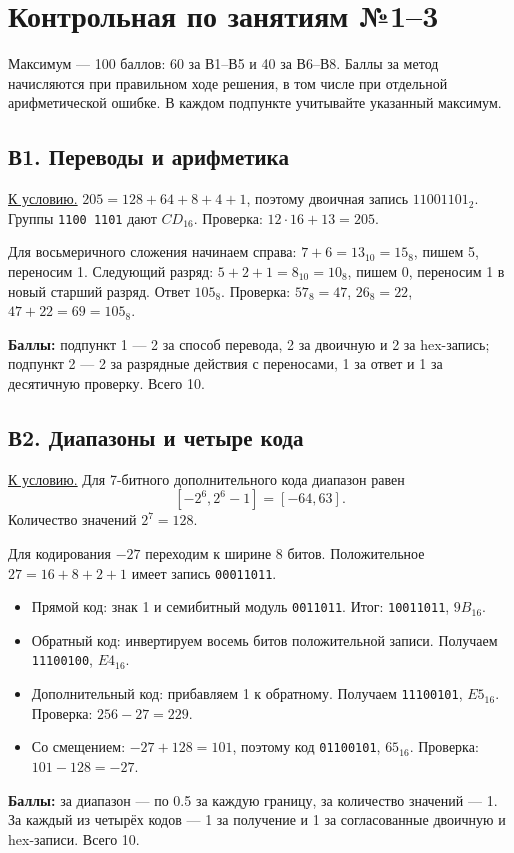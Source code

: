 \section{Контрольная по занятиям №1--3}\label{solutions:mock13}
Максимум --- 100 баллов: 60 за В1--В5 и 40 за В6--В8. Баллы за метод начисляются при правильном ходе решения, в том числе при отдельной арифметической ошибке. В каждом подпункте учитывайте указанный максимум.

\subsection*{В1. Переводы и арифметика}\label{sol:v1}
\hyperref[task:v1]{К условию.}
$205=128+64+8+4+1$, поэтому двоичная запись $11001101_2$. Группы \texttt{1100 1101} дают $CD_{16}$. Проверка: $12\cdot16+13=205$.

Для восьмеричного сложения начинаем справа: $7+6=13_{10}=15_8$, пишем 5, переносим 1. Следующий разряд: $5+2+1=8_{10}=10_8$, пишем 0, переносим 1 в новый старший разряд. Ответ $105_8$.
Проверка: $57_8=47$, $26_8=22$, $47+22=69=105_8$.

\textbf{Баллы:} подпункт 1 --- 2 за способ перевода, 2 за двоичную и 2 за hex-запись; подпункт 2 --- 2 за разрядные действия с переносами, 1 за ответ и 1 за десятичную проверку. Всего 10.

\subsection*{В2. Диапазоны и четыре кода}\label{sol:v2}
\hyperref[task:v2]{К условию.}
Для 7-битного дополнительного кода диапазон равен
\[
[-2^6,2^6-1]=[-64,63].
\]
Количество значений $2^7=128$.

Для кодирования $-27$ переходим к ширине 8 битов. Положительное $27=16+8+2+1$ имеет запись \texttt{00011011}.
\begin{itemize}
    \item Прямой код: знак 1 и семибитный модуль \texttt{0011011}. Итог: \texttt{10011011}, $9B_{16}$.
    \item Обратный код: инвертируем восемь битов положительной записи. Получаем \texttt{11100100}, $E4_{16}$.
    \item Дополнительный код: прибавляем 1 к обратному. Получаем \texttt{11100101}, $E5_{16}$. Проверка: $256-27=229$.
    \item Со смещением: $-27+128=101$, поэтому код \texttt{01100101}, $65_{16}$. Проверка: $101-128=-27$.
\end{itemize}
\textbf{Баллы:} за диапазон --- по 0.5 за каждую границу, за количество значений --- 1. За каждый из четырёх кодов --- 1 за получение и 1 за согласованные двоичную и hex-записи. Всего 10.

